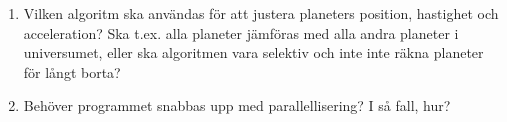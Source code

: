 \begin{enumerate}
    \item Vilken algoritm ska användas för att justera planeters
        position, hastighet och acceleration?
        Ska t.ex. alla planeter jämföras med
        alla andra planeter i universumet,
        eller ska algoritmen vara selektiv och
        inte inte räkna planeter för långt borta?
    \item Behöver programmet snabbas upp med parallellisering?
        I så fall, hur?
\end{enumerate}
